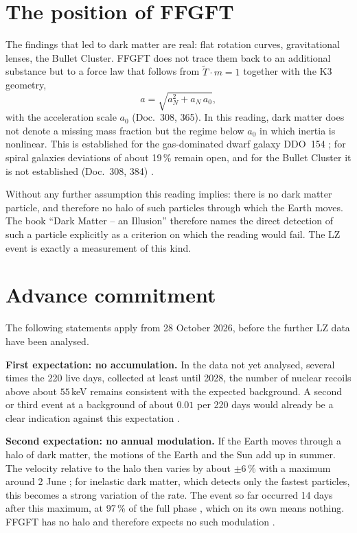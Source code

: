 \section{The position of FFGFT}

The findings that led to dark matter are real: flat rotation curves, gravitational lenses, the
Bullet Cluster. FFGFT does not trace them back to an additional substance but to a force law that
follows from $\tilde T\cdot m=1$ together with the K3 geometry,
\[
  a=\sqrt{a_N^2+a_N\,a_0},
\]
with the acceleration scale $a_0$ (Doc.~308, 365). In this reading, dark matter does not denote a
missing mass fraction but the regime below $a_0$ in which inertia is nonlinear. This is established
for the gas-dominated dwarf galaxy DDO~154 \KM; for spiral galaxies deviations of about 19\,\% remain
open, and for the Bullet Cluster it is not established (Doc.~308, 384) \SM.

Without any further assumption this reading implies: there is no dark matter particle, and therefore
no halo of such particles through which the Earth moves. The book ``Dark Matter -- an Illusion''
therefore names the direct detection of such a particle explicitly as a criterion on which the
reading would fail. The LZ event is exactly a measurement of this kind.

\section{Advance commitment}

The following statements apply from 28 October 2026, before the further LZ data have been analysed.

\textbf{First expectation: no accumulation.} In the data not yet analysed, several times the 220
live days, collected at least until 2028, the number of nuclear recoils above about $55$\,keV remains
consistent with the expected background. A second or third event at a background of about $0.01$
per 220 days would already be a clear indication against this expectation \SM.

\textbf{Second expectation: no annual modulation.} If the Earth moves through a halo of dark matter,
the motions of the Earth and the Sun add up in summer. The velocity relative to the halo then varies
by about $\pm6\,\%$ with a maximum around 2 June \KM; for inelastic dark matter, which detects only
the fastest particles, this becomes a strong variation of the rate. The event so far occurred
14 days after this maximum, at 97\,\% of the full phase \KM, which on its own means nothing. FFGFT has
no halo and therefore expects no such modulation \SM.

